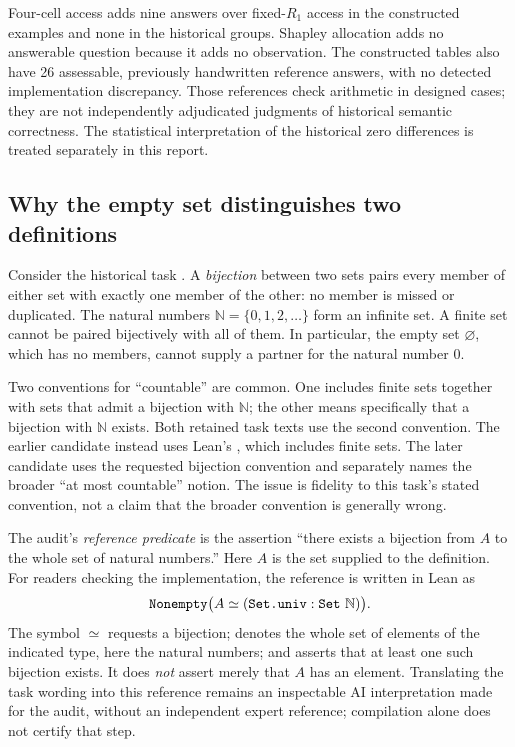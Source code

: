 Four-cell access adds nine answers over fixed-$R_1$ access in the constructed examples and none in the historical groups. Shapley allocation adds no answerable question because it adds no observation. The constructed tables also have 26 assessable, previously handwritten reference answers, with no detected implementation discrepancy. Those references check arithmetic in designed cases; they are not independently adjudicated judgments of historical semantic correctness. The statistical interpretation of the historical zero differences is treated separately in this report.

\subsection{Why the empty set distinguishes two definitions}
\label{subsec:definition-witness}
Consider the historical task . A \emph{bijection} between two sets pairs every member of either set with exactly one member of the other: no member is missed or duplicated. The natural numbers $\mathbb N=\{0,1,2,\ldots\}$ form an infinite set. A finite set cannot be paired bijectively with all of them. In particular, the empty set $\varnothing$, which has no members, cannot supply a partner for the natural number $0$.

Two conventions for ``countable'' are common. One includes finite sets together with sets that admit a bijection with $\mathbb N$; the other means specifically that a bijection with $\mathbb N$ exists. Both retained task texts use the second convention. The earlier candidate instead uses Lean's , which includes finite sets. The later candidate uses the requested bijection convention and separately names the broader ``at most countable'' notion. The issue is fidelity to this task's stated convention, not a claim that the broader convention is generally wrong.

The audit's \emph{reference predicate} is the assertion ``there exists a bijection from $A$ to the whole set of natural numbers.'' Here $A$ is the set supplied to the definition. For readers checking the implementation, the reference is written in Lean as
\[
\code{Nonempty}\bigl(A\simeq(\code{Set.univ}:\code{Set}\ \mathbb N)\bigr).
\]
The symbol $\simeq$ requests a bijection;  denotes the whole set of elements of the indicated type, here the natural numbers; and  asserts that at least one such bijection exists. It does \emph{not} assert merely that $A$ has an element. Translating the task wording into this reference remains an inspectable AI interpretation made for the audit, without an independent expert reference; compilation alone does not certify that step.

